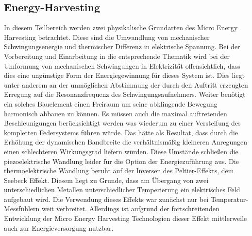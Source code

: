 \documentclass[12pt]{scrreprt} %
\begin{document}
\subsection{Energy-Harvesting}
\label{energy}
In diesem Teilbereich werden zwei physikalische Grundarten des Micro Energy Harvesting betrachtet. Diese sind die Umwandlung von mechanischer Schwingungsenergie und thermischer Differenz in elektrische Spannung. Bei der Vorbereitung und Einarbeitung in die entsprechende Thematik wird bei der Umformung von mechanischen Schwingungen in Elektrizität offensichtlich, dass dies eine ungünstige Form der Energiegewinnung für dieses System ist. Dies liegt unter anderem an der unmöglichen Abstimmung der durch den Auftritt erzeugten Erregung auf die Resonanzfrequenz des Schwingungsaufnehmers. Weiter benötigt ein solches Bauelement einen Freiraum um seine abklingende Bewegung harmonisch abbauen zu können. Es müssen auch die maximal auftretenden Beschleunigungen berücksichtigt werden was wiederum zu einer Versteifung des kompletten Federsystems führen würde. Das hätte als Resultat, dass durch die Erhöhung der dynamischen Bandbreite die verhältnismäßig kleineren Anregungen einen schlechteren Wirkungsgrad liefern würden. Diese Umstände schließen die piezoelektrische Wandlung leider für die Option der Energiezuführung aus. \citep[vgl. S.39]{Dembowski2011} \newline 
Die thermoelektrische Wandlung beruht auf der Inversen des Peltier-Effekts, dem Seebeck Effekt. Diesem liegt zu Grunde, dass am Übergang von zwei unterschiedlichen Metallen unterschiedlicher Temperierung ein elektrisches Feld aufgebaut wird. Die Verwendung dieses Effekts war zunächst nur bei Temperatur-Messfühlern weit verbreitet. Allerdings ist aufgrund der fortschreitenden Entwicklung der Micro Energy Harvesting Technologien dieser Effekt mittlerweile auch zur Energieversorgung nutzbar. \newline \newline
\end{document}
